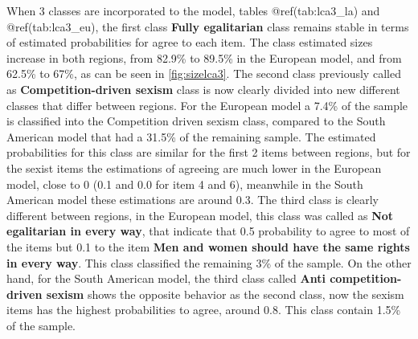 \documentclass[12pt,twoside]{reedthesis}
\begin{document}
When 3 classes are incorporated to the model, tables @ref(tab:lca3\_la) and @ref(tab:lca3\_eu), the first class \textbf{Fully egalitarian} class remains stable in terms of estimated probabilities for agree to each item. The class estimated sizes increase in both regions, from 82.9\% to 89.5\% in the European model, and from 62.5\% to 67\%, as can be seen in \ref{fig:sizelca3}. The second class previously called as \textbf{Competition-driven sexism} class is now clearly divided into new different classes that differ between regions.
For the European model a 7.4\% of the sample is classified into the Competition driven sexism class, compared to the South American model that had a 31.5\% of the remaining sample. The estimated probabilities for this class are similar for the first 2 items between regions, but for the sexist items the estimations of agreeing are much lower in the European model, close to 0 (0.1 and 0.0 for item 4 and 6), meanwhile in the South American model these estimations are around 0.3.
The third class is clearly different between regions, in the European model, this class was called as \textbf{Not egalitarian in every way}, that indicate that 0.5 probability to agree to most of the items but 0.1 to the item \textbf{Men and women should have the same rights in every way}. This class classified the remaining 3\% of the sample.
On the other hand, for the South American model, the third class called \textbf{Anti competition-driven sexism} shows the opposite behavior as the second class, now the sexism items has the highest probabilities to agree, around 0.8. This class contain 1.5\% of the sample.
\end{document}
